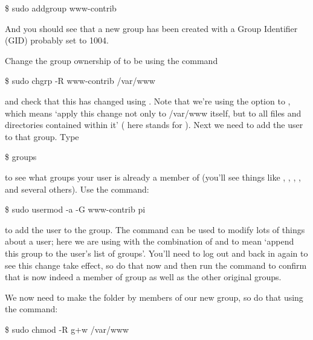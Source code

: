 \begin{ttoutenv}
\$ sudo addgroup www-contrib
\end{ttoutenv}

And you should see that a new group has been created with a Group Identifier (GID) probably set to 1004.

Change the group ownership of  to be  using the command

\begin{ttoutenv}
\$ sudo chgrp -R www-contrib /var/www
\end{ttoutenv}

and check that this has changed using . Note that we're using the  option to , which means `apply this change not only to /var/www itself, but to all files and directories contained within it' ( here stands for ). Next we need to add the  user to that group. Type

\begin{ttoutenv}
\$ groups
\end{ttoutenv}

to see what groups your user is already a member of (you'll see things like , , , ,  and several others). Use the command:

\begin{ttoutenv}
\$ sudo usermod -a -G www-contrib pi
\end{ttoutenv}

to add the  user to the  group. The  command can be used to modify lots of things about a user; here we are using with the combination of  and  to mean `append this group to the user's list of groups'. You'll need to log out and back in again to see this change take effect, so do that now and then run the  command to confirm that  is now indeed a member of group  as well as the other original groups.


We now need to make the  folder  by members of our new group, so do that using the command:

\begin{ttoutenv}
\$ sudo chmod -R g+w /var/www
\end{ttoutenv}

